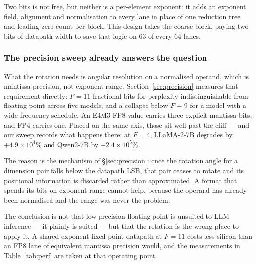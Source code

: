 \begin{table}[t]
\caption{Relative rotation error against block size $D$ (pairs per shared
exponent), Binary UD $N=10$, on real Qwen2 query activations. $D=64$ is one
exponent per head-token; $D=1$ is a per-element float.}
\label{tab:blocksize}
\centering
{}
\end{table}

Two bits is not free, but neither is a per-element exponent: it adds an
exponent field, alignment and normalisation to every lane in place of one
reduction tree and leading-zero count per block. This design takes the coarse
block, paying two bits of datapath width to save that logic on $63$ of every
$64$ lanes.

\subsubsection{The precision sweep already answers the question}
What the rotation needs is angular resolution on a normalised operand, which
is mantissa precision, not exponent range. Section~\ref{sec:precision}
measures that requirement directly: $F = 11$ fractional bits for perplexity
indistinguishable from floating point across five models, and a collapse below
$F = 9$ for a model with a wide frequency schedule. An E4M3 FP8 value carries
three explicit mantissa bits, and FP4 carries one. Placed on the same axis,
those sit well past the cliff --- and our sweep records what happens there:
at $F = 4$, LLaMA-2-7B degrades by $+4.9\times10^{4}\%$ and Qwen2-7B by
$+2.4\times10^{5}\%$.

The reason is the mechanism of \S\ref{sec:precision}: once the rotation angle
for a dimension pair falls below the datapath LSB, that pair ceases to rotate
and its positional information is discarded rather than approximated. A format
that spends its bits on exponent range cannot help, because the operand has
already been normalised and the range was never the problem.

The conclusion is not that low-precision floating point is unsuited to LLM
inference --- it plainly is suited --- but that the rotation is the wrong
place to apply it. A shared-exponent fixed-point datapath at $F = 11$ costs
less silicon than an FP8 lane of equivalent mantissa precision would, and the
measurements in Table~\ref{tab:perf} are taken at that operating point.
